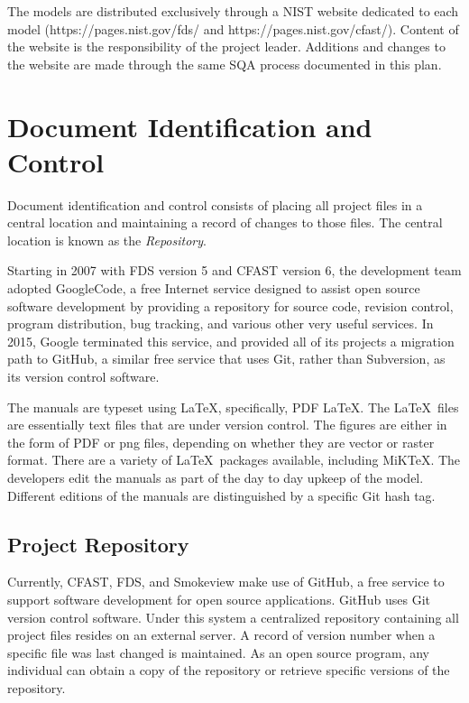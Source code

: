 \documentclass[11pt]{book}
\begin{document}
The models are distributed exclusively through a NIST website dedicated to each model (https://pages.nist.gov/fds/ and https://pages.nist.gov/cfast/).  Content of the website is the responsibility of the project leader. Additions and changes to the website are made through the same SQA process documented in this plan.


\section{Document Identification and Control}

Document identification and control consists of placing all project files in a central location and maintaining a record of changes to those files. The central location is known as the {\em Repository}.

Starting in 2007 with FDS version 5 and CFAST version 6, the development team adopted GoogleCode, a free Internet service designed to assist open source software development by providing a repository for source code, revision control, program distribution, bug tracking, and various other very useful services. In 2015, Google terminated this service, and provided all of its projects a migration path to GitHub, a similar free service that uses Git, rather than Subversion, as its version control software.

The manuals are typeset using \LaTeX, specifically, PDF \LaTeX. The \LaTeX\ files are essentially text files that are under version control. The figures are either in the form of PDF or png files, depending on whether they are vector or raster format. There are a variety of \LaTeX\ packages available, including MiKTeX. The developers edit the manuals as part of the day to day upkeep of the model. Different editions of the manuals are distinguished by a specific Git hash tag.


\subsection{Project Repository}

Currently, CFAST, FDS, and Smokeview make use of GitHub, a free service to support software development for open source applications. GitHub uses Git version control software. Under this system a centralized repository containing all project files resides on an external server.   A record of version number when a specific file was last changed is maintained. As an open source program, any individual can obtain a copy of the repository or retrieve specific versions of the repository.
\end{document}
